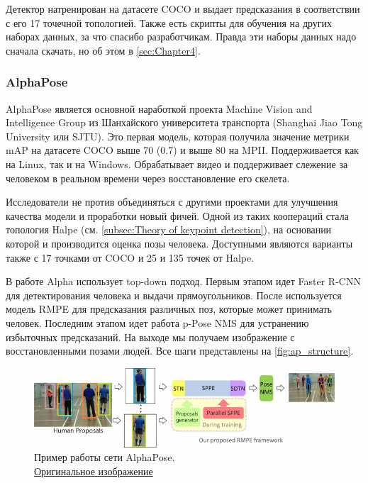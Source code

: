 Детектор натренирован на датасете COCO и выдает предсказания в соответствии с его 17 точечной топологией. Также есть скрипты для обучения на других наборах данных, за что спасибо разработчикам. Правда эти наборы данных надо сначала скачать, но об этом в \autoref{sec:Chapter4}.



\subsubsection{AlphaPose}

AlphaPose является основной наработкой проекта Machine Vision and Intelligence Group из Шанхайского университета транспорта (Shanghai Jiao Tong University или SJTU). Это первая модель, которая получила значение метрики mAP на датасете COCO выше 70 (0.7) и выше 80 на MPII. Поддерживается как на Linux, так и на Windows. Обрабатывает видео и поддерживает слежение за человеком в реальном времени через восстановление его скелета.

Исследователи не против объединяться с другими проектами для улучшения качества модели и проработки новый фичей. Одной из таких коопераций стала топология Halpe (см. \autoref{subsec:Theory of keypoint detection}), на основании которой и производится оценка позы человека. Доступными являются варианты также с 17 точками от COCO и 25 и 135 точек от Halpe.

В работе Alpha использует top-down подход. Первым этапом идет Faster R-CNN для детектирования человека и выдачи прямоугольников. После используется модель RMPE для предсказания различных поз, которые может принимать  человек. Последним этапом идет работа p-Pose NMS для устранению избыточных предсказаний. На выходе мы получаем изображение с восстановленными позами людей. Все шаги представлены на \autoref{fig:ap_structure}. \cite{fang2017rmpe}

\begin{figure}[h]
	\centering
	\includegraphics[width=\textwidth]{./images/AlphaPose_structure}
	\caption{Пример работы сети AlphaPose.\\ \href{https://ieeexplore.ieee.org/mediastore_new/IEEE/content/media/8234942/8237262/8237518/8237518-fig-3-source-large.gif}{Оригинальное изображение}}
	\label{fig:ap_structure}
\end{figure}

